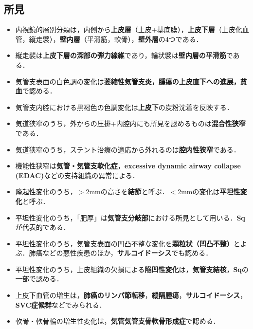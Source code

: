 \subsection{所見}
\begin{itemize}

\item 内視鏡的層別分類は，内側から\textbf{上皮層}（上皮+基底膜），\textbf{上皮下層}（上皮化血管，縦走襞），\textbf{壁内層}（平滑筋，軟骨），\textbf{壁外層}の4つである．

\item 縦走襞は\textbf{上皮下層の深部の弾力線維}であり，輪状襞は\textbf{壁内層の平滑筋}である．

\item 気管支表面の白色調の変化は\textbf{萎縮性気管支炎，腫瘍の上皮直下への進展，貧血}で認める．
\item 気管支内腔における黒褐色の色調変化は\textbf{上皮下}の炭粉沈着を反映する．
\item 気道狭窄のうち，外からの圧排+内腔内にも所見を認めるものは\textbf{混合性狭窄}である．
\item 気道狭窄のうち，ステント治療の適応から外れるのは\textbf{腔内性狭窄}である．
\item 機能性狭窄は\textbf{気管・気管支軟化症}，\textbf{excessive dynamic airway collapse (EDAC)}などの支持組織の異常による．

\item 隆起性変化のうち，$>$2mmの高さを\textbf{結節}と呼ぶ．$<$2mmの変化は\textbf{平坦性変化}と呼ぶ．
\item 平坦性変化のうち，「肥厚」は\textbf{気管支分岐部}における所見として用いる．\textbf{Sq}が代表的である．
\item 平坦性変化のうち，気管支表面の凹凸不整な変化を\textbf{顆粒状（凹凸不整）}とよぶ．肺癌などの悪性疾患のほか，\textbf{サルコイドーシス}でも認める．
\item 平坦性変化のうち，上皮組織の欠損による\textbf{陥凹性変化}は，\textbf{気管支結核}，\textbf{Sq}の一部で認める．

\item 上皮下血管の増生は，\textbf{肺癌のリンパ節転移}，\textbf{縦隔腫瘍}，\textbf{サルコイドーシス}，\textbf{SVC症候群}などでみられる．
\item 軟骨・軟骨輪の増生性変化は，\textbf{気管気管支骨軟骨形成症}で認める．

\end{itemize}
